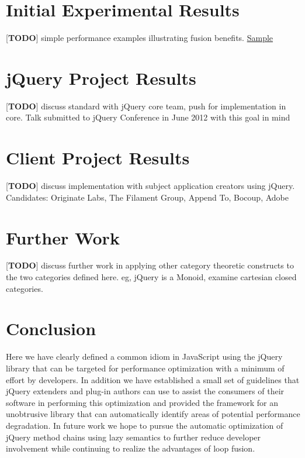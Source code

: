 \documentclass[preprint, leqno]{sigplanconf}
\begin{document}
\section{Initial Experimental Results}

[\textbf{TODO}] simple performance examples illustrating fusion benefits. \href{http://jsperf.com/lazy-loop-fusion-vs-traditional-method-chaning/5}{Sample}

\section{jQuery Project Results}

[\textbf{TODO}] discuss standard with jQuery core team, push for implementation in core. Talk submitted to jQuery Conference in June 2012 with this goal in mind

\section{Client Project Results}

[\textbf{TODO}] discuss implementation with subject application creators using jQuery. Candidates: Originate Labs, The Filament Group, Append To, Bocoup, Adobe

\section{Further Work}

[\textbf{TODO}] discuss further work in applying other category theoretic constructs to the two categories defined here. eg, jQuery is a Monoid, examine cartesian closed categories.

\section{Conclusion}

Here we have clearly defined a common idiom in JavaScript using the jQuery library that can be targeted for performance optimization with a minimum of effort by developers. In addition we have established a small set of guidelines that jQuery extenders and plug-in authors can use to assist the consumers of their software in performing this optimization and provided the framework for an unobtrusive library that can automatically identify areas of potential performance degradation. In future work we hope to pursue the automatic optimization of jQuery method chains using lazy semantics to further reduce developer involvement while continuing to realize the advantages of loop fusion.
\end{document}
